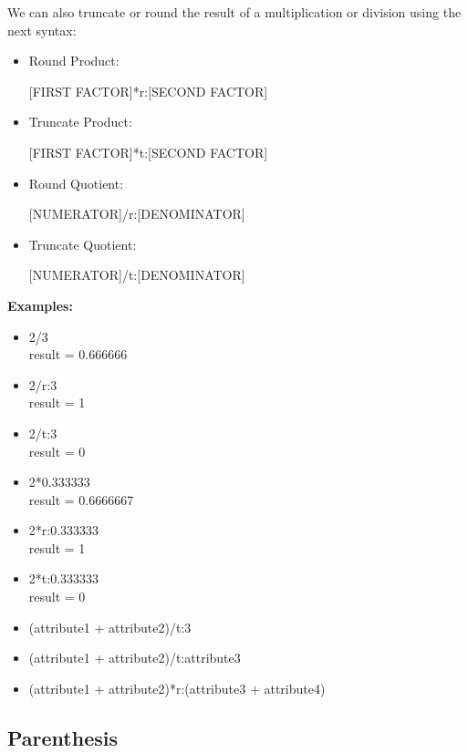 \documentclass[11pt,a4paper,openright,oneside]{book}
\newenvironment{exs}
{
  \setlength{\parindent}{0cm}
  \large \textbf{Examples:} \normalsize
}
{}
\begin{document}
We can also truncate or round the result of a multiplication or division using the next syntax:
\begin{itemize}
  \item Round Product:
    \begin{center} \textsf{\textsc{\scriptsize[FIRST FACTOR]}*r:\textsc{\scriptsize[SECOND FACTOR]}} \normalsize \end{center}
  \item Truncate Product:
    \begin{center} \textsf{\textsc{\scriptsize[FIRST FACTOR]}*t:\textsc{\scriptsize[SECOND FACTOR]}} \normalsize \end{center}
  \item Round Quotient:
    \begin{center} \textsf{\textsc{\scriptsize[NUMERATOR]}/r:\textsc{\scriptsize[DENOMINATOR]}} \normalsize \end{center}
  \item Truncate Quotient:
    \begin{center} \textsf{\textsc{\scriptsize[NUMERATOR]}/t:\textsc{\scriptsize[DENOMINATOR]}} \normalsize \end{center}
\end{itemize}

\begin{exs}
  \begin{itemize}
    \item 2/3 \\ result = 0.666666
    \item 2/r:3 \\ result = 1
    \item 2/t:3 \\ result = 0
    \item 2*0.333333 \\ result = 0.6666667
    \item 2*r:0.333333 \\ result = 1
    \item 2*t:0.333333 \\ result = 0
    \item (attribute1 + attribute2)/t:3
    \item (attribute1 + attribute2)/t:attribute3
    \item (attribute1 + attribute2)*r:(attribute3 + attribute4)
  \end{itemize}
\end{exs}

\subsection{Parenthesis}
  
\end{document}
